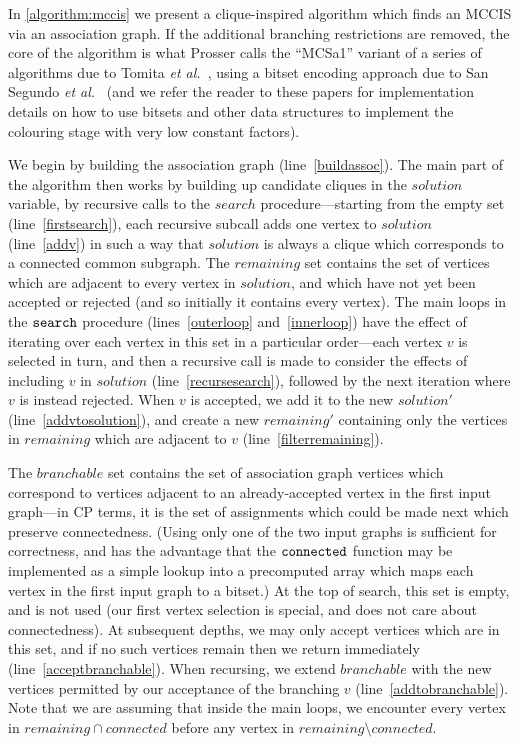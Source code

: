 \documentclass{llncs}
\newcommand{\lineref}[1]{line~\ref{#1}}
\newcommand{\twolinesref}[2]{lines~\ref{#1} and~\ref{#2}}
\begin{document}
In \cref{algorithm:mccis} we present a clique-inspired algorithm which finds an MCCIS via an
association graph. If the additional
branching restrictions are removed, the core of the algorithm is what Prosser
\cite{DBLP:journals/algorithms/Prosser12} calls the ``MCSa1'' variant of a series of algorithms due
to Tomita \textit{et al.}\
\cite{DBLP:conf/dmtcs/TomitaS03,DBLP:journals/jgo/TomitaK07,DBLP:conf/walcom/TomitaSHTW10}, using a
bitset encoding approach due to San Segundo \textit{et al.}\
\cite{DBLP:journals/cor/SegundoRJ11,DBLP:journals/ol/SegundoMRH13} (and we refer the reader to these
papers for implementation details on how to use bitsets and other data structures to implement the
colouring stage with very low constant factors).

We begin by building the association graph (\lineref{buildassoc}). The main part of the algorithm
then works by building up candidate cliques in the $\mathit{solution}$ variable, by recursive calls
to the $\mathit{search}$ procedure---starting from the empty set (\lineref{firstsearch}), each
recursive subcall adds one vertex to $\mathit{solution}$ (\lineref{addv}) in such a way that
$\mathit{solution}$ is always a clique which corresponds to a connected common subgraph. The
$\mathit{remaining}$ set contains the set of vertices which are adjacent to every vertex in
$\mathit{solution}$, and which have not yet been accepted or rejected (and so initially it contains
every vertex). The main loops in the $\FuncSty{search}$ procedure
(\twolinesref{outerloop}{innerloop}) have the effect of iterating over each vertex in this set in a
particular order---each vertex $v$ is selected in turn, and then a recursive call is made to
consider the effects of including $v$ in $\mathit{solution}$ (\lineref{recursesearch}), followed by
the next iteration where $v$ is instead rejected. When $v$ is accepted, we add it to the new
$\mathit{solution'}$ (\lineref{addvtosolution}), and create a new $\mathit{remaining'}$ containing
only the vertices in $\mathit{remaining}$ which are adjacent to $v$ (\lineref{filterremaining}).

The $\mathit{branchable}$ set contains the set of association graph vertices which correspond to
vertices adjacent to an already-accepted vertex in the first input graph---in CP terms, it is the
set of assignments which could be made next which preserve connectedness. (Using only one of the two
input graphs is sufficient for correctness, and has the advantage that the $\FuncSty{connected}$
function may be implemented as a simple lookup into a precomputed array which maps each vertex in
the first input graph to a bitset.) At the top of search, this set is empty, and is not used (our
first vertex selection is special, and does not care about connectedness). At subsequent depths, we
may only accept vertices which are in this set, and if no such vertices remain then we return
immediately (\lineref{acceptbranchable}). When recursing, we extend $\mathit{branchable}$ with the
new vertices permitted by our acceptance of the branching $v$ (\lineref{addtobranchable}). Note that
we are assuming that inside the main loops, we encounter every vertex in $\mathit{remaining} \cap
\mathit{connected}$ before any vertex in $\mathit{remaining} \setminus \mathit{connected}$.
\end{document}
